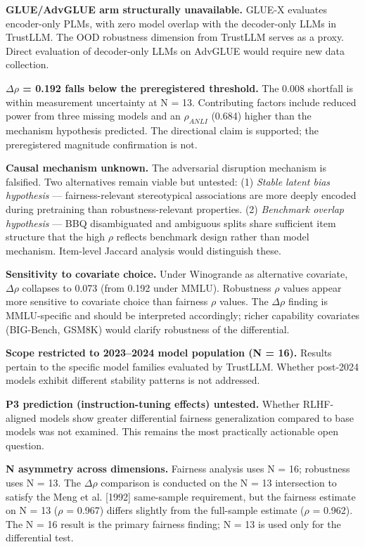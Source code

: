 \textbf{GLUE/AdvGLUE arm structurally unavailable.} GLUE-X \citep{Yang2023GLUEX} evaluates encoder-only PLMs, with zero model overlap with the decoder-only LLMs in TrustLLM. The OOD robustness dimension from TrustLLM serves as a proxy. Direct evaluation of decoder-only LLMs on AdvGLUE would require new data collection.

\textbf{$\Delta\rho$ = 0.192 falls below the preregistered threshold.} The 0.008 shortfall is within measurement uncertainty at N = 13. Contributing factors include reduced power from three missing models and an $\rho_{ANLI}$ (0.684) higher than the mechanism hypothesis predicted. The directional claim is supported; the preregistered magnitude confirmation is not.

\textbf{Causal mechanism unknown.} The adversarial disruption mechanism is falsified. Two alternatives remain viable but untested: (1) \textit{Stable latent bias hypothesis} --- fairness-relevant stereotypical associations are more deeply encoded during pretraining than robustness-relevant properties. (2) \textit{Benchmark overlap hypothesis} --- BBQ disambiguated and ambiguous splits share sufficient item structure that the high $\rho$ reflects benchmark design rather than model mechanism. Item-level Jaccard analysis would distinguish these.

\textbf{Sensitivity to covariate choice.} Under Winogrande as alternative covariate, $\Delta\rho$ collapses to 0.073 (from 0.192 under MMLU). Robustness $\rho$ values appear more sensitive to covariate choice than fairness $\rho$ values. The $\Delta\rho$ finding is MMLU-specific and should be interpreted accordingly; richer capability covariates (BIG-Bench, GSM8K) would clarify robustness of the differential.

\textbf{Scope restricted to 2023--2024 model population (N = 16).} Results pertain to the specific model families evaluated by TrustLLM. Whether post-2024 models exhibit different stability patterns is not addressed.

\textbf{P3 prediction (instruction-tuning effects) untested.} Whether RLHF-aligned models show greater differential fairness generalization compared to base models was not examined. This remains the most practically actionable open question.

\textbf{N asymmetry across dimensions.} Fairness analysis uses N = 16; robustness uses N = 13. The $\Delta\rho$ comparison is conducted on the N = 13 intersection to satisfy the Meng et al. [1992] same-sample requirement, but the fairness estimate on N = 13 ($\rho$ = 0.967) differs slightly from the full-sample estimate ($\rho$ = 0.962). The N = 16 result is the primary fairness finding; N = 13 is used only for the differential test.

